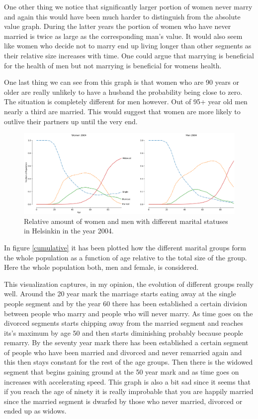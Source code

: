 \documentclass{article}
\begin{document}
One other thing we notice that significantly larger portion of women never marry and again this would have been much harder to distinguish from the absolute value graph. During the latter years the portion of women who have never married is twice as large as the corresponding man's value. It would also seem like women who decide not to marry end up living longer than other segments as their relative size increases with time. One could argue that marrying is beneficial for the health of men but not marrying is beneficial for womens health. 

One last thing we can see from this graph is that women who are 90 years or older are really unlikely to have a husband the probability being close to zero. The situation is completely different for men however. Out of 95+ year old men nearly a third are married. This would suggest that women are more likely to outlive their partners up until the very end. 

\begin{figure}[h!]
	\centering
	\includegraphics[width = \linewidth]{relative}
	\caption{Relative amount of women and men with different marital statuses in Helsinkin in the year 2004.}
	\label{relative}
\end{figure}

In figure \ref{cumulative} it has been plotted how the different marital groups form the whole population as a function of age relative to the total size of the group. Here the whole population both, men and female, is considered.

This visualization captures, in my opinion, the evolution of different groups really well. Around the 20 year mark the marriage starts eating away at the single people segment and by the year 60 there has been established a certain division between people who marry and people who will never marry. As time goes on the divorced segments starts chipping away from the married segment and reaches its's maximum by age 50 and then starts diminishing probably because people remarry. By the seventy year mark there has been established a certain segment of people who have been married and divorced and never remarried again and this then stays constant for the rest of the age groups. Then there is the widowed segment that begins gaining ground at the 50 year mark and as time goes on increases with accelerating speed. This graph is also a bit sad since it seems that if you reach the age of ninety it is really improbable that you are happily married since the married segment is dwarfed by those who never married, divorced or ended up as widows. 
\end{document}
